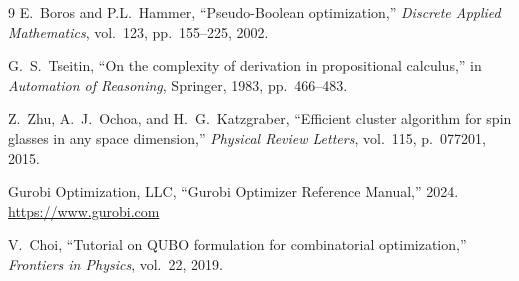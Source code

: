 \documentclass[11pt,a4paper]{article}
\begin{document}

\begin{thebibliography}{9}
  E.~Boros and P.L.~Hammer,
  ``Pseudo-Boolean optimization,''
  \emph{Discrete Applied Mathematics}, vol.~123, pp.~155--225, 2002.

  G.~S.~Tseitin,
  ``On the complexity of derivation in propositional calculus,''
  in \emph{Automation of Reasoning}, Springer, 1983, pp.~466--483.

  Z.~Zhu, A.~J.~Ochoa, and H.~G.~Katzgraber,
  ``Efficient cluster algorithm for spin glasses in any space dimension,''
  \emph{Physical Review Letters}, vol.~115, p.~077201, 2015.

  Gurobi Optimization, LLC,
  ``Gurobi Optimizer Reference Manual,'' 2024.
  \url{https://www.gurobi.com}

  V.~Choi,
  ``Tutorial on QUBO formulation for combinatorial optimization,''
  \emph{Frontiers in Physics}, vol.~22, 2019.
\end{thebibliography}
\end{document}
